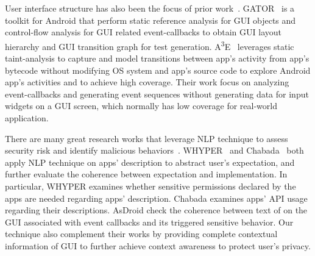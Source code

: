 User interface structure has also been the focus of prior
work~\cite{Azim2013, yang-ase15,yang2013grey}. GATOR~\cite{yang-ase15}
is a toolkit for Android that perform static reference analysis for GUI
objects and control-flow analysis for GUI related event-callbacks to
obtain GUI layout hierarchy and GUI transition graph for test
generation. A\textsuperscript{3}E~\cite{Azim2013} leverages static
taint-analysis to capture and model transitions between app's activity
from app's bytecode without modifying OS system and app's source code to
explore Android app's activities and to achieve high coverage. Their
work focus on analyzing event-callbacks and generating event sequences
without generating data for input widgets on a GUI screen, which normally
has low coverage for real-world application. 

There are many great research works that leverage NLP technique to assess security risk and 
identify malicious behaviors~\cite{gtgz:14,hlxw:15,Huang:2014,nmyz:15,pxy:13}.  
WHYPER~\cite{pxy:13} and Chabada~\cite{gtgz:14} both apply NLP technique on apps' 
description to abstract user's expectation, and further evaluate the coherence between 
expectation and implementation. In particular, WHYPER examines whether sensitive 
permissions declared by the apps are needed regarding apps' description. Chabada examines 
apps' API usage regarding their descriptions. AsDroid check the coherence between text of on 
the GUI associated with event callbacks and its triggered sensitive behavior. Our technique also 
complement their works by providing complete contextual information of GUI to further achieve 
context awareness to protect user's privacy.  